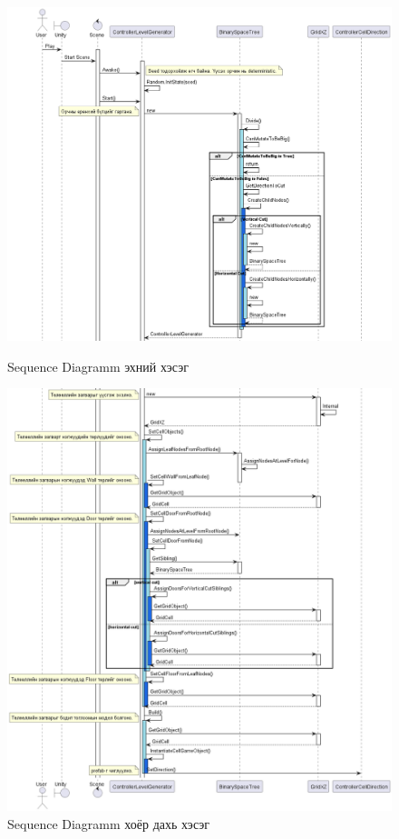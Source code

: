 \begin{figure}[t]
	\centering
	\caption{Sequence Diagramm эхний хэсэг}
	\includegraphics[width=\textwidth]{./images/sequence_1.png}
	\label{fig:SequenceDiagramm1}
\end{figure}
\begin{figure}[b]
	\centering
	\includegraphics[width=\textwidth]{./images/sequence_2.png}
	\caption{Sequence Diagramm хоёр дахь хэсэг}
	\label{fig:SequenceDiagramm2}
\end{figure}


